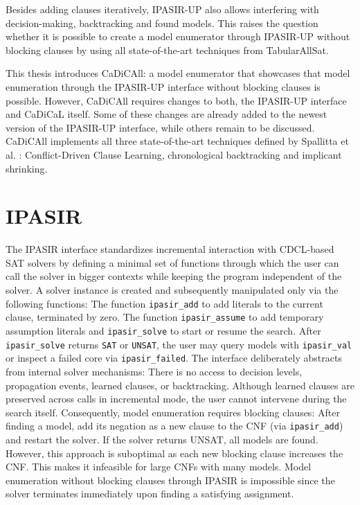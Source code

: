 \documentclass[12pt,a4paper]{article}
\begin{document}
Besides adding clauses iteratively, IPASIR-UP also allows interfering with decision-making, backtracking and found models. This raises the question whether it is possible to create a model enumerator through IPASIR-UP without blocking clauses by using all state-of-the-art techniques from TabularAllSat.

This thesis introduces CaDiCAll: a model enumerator that showcases that model enumeration through the IPASIR-UP interface without blocking clauses is possible. However, CaDiCAll requires changes to both, the IPASIR-UP interface and CaDiCaL itself. Some of these changes are already added to the newest version of the IPASIR-UP interface, while others remain to be discussed. CaDiCAll implements all three state-of-the-art techniques defined by Spallitta et al. \citep{Spallitta_Sebastiani_Biere_2024}: Conflict-Driven Clause Learning, chronological backtracking and implicant shrinking. 

\newpage

\section{IPASIR}
\label{sec:ipasir}
The IPASIR interface \cite{BALYO201645} standardizes incremental interaction with CDCL-based SAT solvers by defining a minimal set of functions through which the user can call the solver in bigger contexts while keeping the program independent of the solver. A solver instance is created and subsequently manipulated only via the following functions: The function \verb|ipasir_add| to add literals to the current clause, terminated by zero. The function \verb|ipasir_assume| to add temporary assumption literals and \verb|ipasir_solve| to start or resume the search. After \verb|ipasir_solve| returns \verb|SAT| or \verb|UNSAT|, the user may query models with \verb|ipasir_val| or inspect a failed core via \verb|ipasir_failed|. The interface deliberately abstracts from internal solver mechanisms: There is no access to decision levels, propagation events, learned clauses, or backtracking. Although learned clauses are preserved across calls in incremental mode, the user cannot intervene during the search itself. Consequently, model enumeration requires blocking clauses: After finding a model, add its negation as a new clause to the CNF (via \verb|ipasir_add|) and restart the solver. If the solver returns UNSAT, all models are found. However, this approach is suboptimal as each new blocking clause increases the CNF. This makes it infeasible for large CNFs with many models. Model enumeration without blocking clauses through IPASIR is impossible since the solver terminates immediately upon finding a satisfying assignment.
\end{document}
